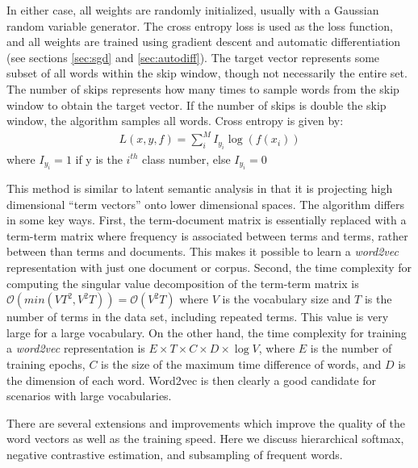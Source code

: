 In either case, all weights are randomly initialized, usually with a Gaussian random variable generator.  The cross entropy loss is used as the loss function, and all weights are trained using gradient descent and automatic differentiation (see sections \ref{sec:sgd} and \ref{sec:autodiff}).  The target vector represents some subset of all words within the skip window, though not necessarily the entire set.  The number of skips represents how many times to sample words from the skip window to obtain the target vector.  If the number of skips is double the skip window, the algorithm samples all words.  Cross entropy is given by:
\begin{align}\label{eq:crossent}
L(x,y,f) = \sum_i^M I_{y_i} \log(f(x_i))
\end{align}
where $I_{y_i} = 1$ if y is the $i^{th}$ class number, else $I_{y_i} = 0$

This method is similar to latent semantic analysis in that it is projecting high dimensional ``term vectors'' onto lower dimensional spaces.  The algorithm differs in some key ways.  First, the term-document matrix is essentially replaced with a term-term matrix where frequency is associated between terms and terms, rather between than terms and documents.  This makes it possible to learn a \textit{word2vec} representation with just one document or corpus.  Second, the time complexity for computing the singular value decomposition of the term-term matrix is $\mathcal{O}(min(VT^2,V^2T)) = \mathcal{O}(V^2T)$ where $V$ is the vocabulary size and $T$ is the number of terms in the data set, including repeated terms.  This value is very large for a large vocabulary.  On the other hand, the time complexity for training a \textit{word2vec} representation is $E\times T\times C\times D\times \log V$, where $E$ is the number of training epochs, $C$ is the size of the maximum time difference of words, and $D$ is the dimension of each word.  Word2vec is then clearly a good candidate for scenarios with large vocabularies.

There are several extensions and improvements which improve the quality of the word vectors as well as the training speed. \cite{tm13} Here we discuss hierarchical softmax, negative contrastive estimation, and subsampling of frequent words.

